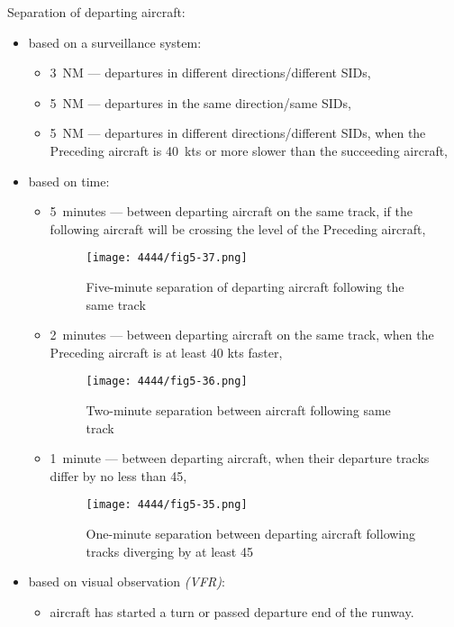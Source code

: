 \clearpage
Separation of departing aircraft:
\begin{itemize}
    \item based on a surveillance system:
    \begin{itemize}
        \item 3~NM --- departures in different directions/different SIDs,
        \item 5~NM --- departures in the same direction/same SIDs,
        \item 5~NM --- departures in different directions/different SIDs, when the Preceding aircraft is 40~kts or more slower than the succeeding aircraft,
    \end{itemize}
    \item based on time:
    \begin{itemize}
        \item 5~minutes --- between departing aircraft on the same track, if the following aircraft will be crossing the level of the Preceding aircraft,
        \begin{figure}[htbp]
            \centering
            \texttt{[image: 4444/fig5-37.png]}
            \caption{Five-minute separation of departing aircraft following the same track~\cite{4444}}
            \label{fig:5min_departures}
        \end{figure}
        \item 2~minutes --- between departing aircraft on the same track, when the Preceding aircraft is at least 40 kts faster,
        \begin{figure}[htbp]
            \centering
            \texttt{[image: 4444/fig5-36.png]}
            \caption{Two-minute separation between aircraft following same track~\cite{4444}}
            \label{fig:2min_departures}
        \end{figure}
        \item 1~minute --- between departing aircraft, when their departure tracks differ by no less than 45\degree ,
        \begin{figure}[htbp]
            \centering
            \texttt{[image: 4444/fig5-35.png]}
            \caption{One-minute separation between departing aircraft following tracks diverging by at least 45\degree~\cite{4444}}
            \label{fig:1min_departures}
        \end{figure}
    \end{itemize}
    \item based on visual observation \emph{(VFR)}:
    \begin{itemize}
        \item aircraft has started a turn or passed departure end of the runway.
    \end{itemize}
\end{itemize}


